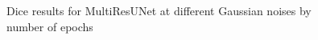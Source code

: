 \begin{figure}
    \centerline{}
    \caption{Dice results for MultiResUNet at different Gaussian noises by number of epochs}
    \label{figure:all-noises-by-epoch-dice-multiresunet}
\end{figure}

